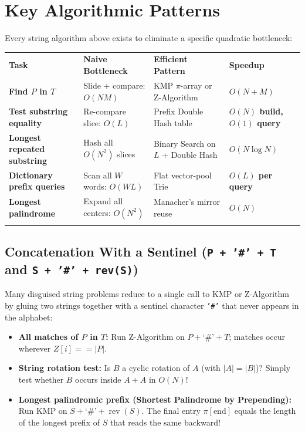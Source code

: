 \documentclass[11pt,a4paper]{article}
\theoremstyle{definition}
\begin{document}
\section{Key Algorithmic Patterns}

Every string algorithm above exists to eliminate a specific quadratic bottleneck:

\begingroup\small{}
\begin{tabularx}{\textwidth}{>{\raggedright\arraybackslash\bfseries}p{3.8cm} >{\raggedright\arraybackslash}p{3.9cm} >{\raggedright\arraybackslash}X >{\raggedright\arraybackslash\bfseries}p{2.4cm}}
\arrayrulecolor{primaryblue}\toprule[1.2pt]
\rowcolor{primaryblue!10}
\textcolor{primaryblue}{\textbf{Task}} & \textcolor{primaryblue}{\textbf{Naive Bottleneck}} & \textcolor{primaryblue}{\textbf{Efficient Pattern}} & \textcolor{primaryblue}{\textbf{Speedup}} \\
\arrayrulecolor{codeframe}\midrule[0.6pt]
Find $P$ in $T$ & Slide + compare: $O(NM)$ & KMP $\pi$-array or Z-Algorithm & $O(N + M)$ \\
Test substring equality & Re-compare slice: $O(L)$ & Prefix Double Hash table & $O(N)$ build, $O(1)$ query \\
Longest repeated substring & Hash all $O(N^2)$ slices & Binary Search on $L$ + Double Hash & $O(N \log N)$ \\
Dictionary prefix queries & Scan all $W$ words: $O(WL)$ & Flat vector-pool Trie & $O(L)$ per query \\
Longest palindrome & Expand all centers: $O(N^2)$ & Manacher's mirror reuse & $O(N)$ \\
\arrayrulecolor{primaryblue}\bottomrule[1.2pt]
\end{tabularx}\endgroup

\subsection{Concatenation With a Sentinel (\texttt{P + '\#' + T} and \texttt{S + '\#' + rev(S)})}

Many disguised string problems reduce to a single call to KMP or Z-Algorithm by gluing two strings together with a sentinel character \texttt{'\#'} that never appears in the alphabet:
\begin{itemize}
    \item \textbf{All matches of $P$ in $T$:} Run Z-Algorithm on $P + \text{`\#'} + T$; matches occur wherever $Z[i] == |P|$.
    \item \textbf{String rotation test:} Is $B$ a cyclic rotation of $A$ (with $|A| = |B|$)? Simply test whether $B$ occurs inside $A + A$ in $O(N)$!
    \item \textbf{Longest palindromic prefix (Shortest Palindrome by Prepending):} Run KMP on $S + \text{`\#'} + \operatorname{rev}(S)$. The final entry $\pi[\text{end}]$ equals the length of the longest prefix of $S$ that reads the same backward!
\end{itemize}
\end{document}
